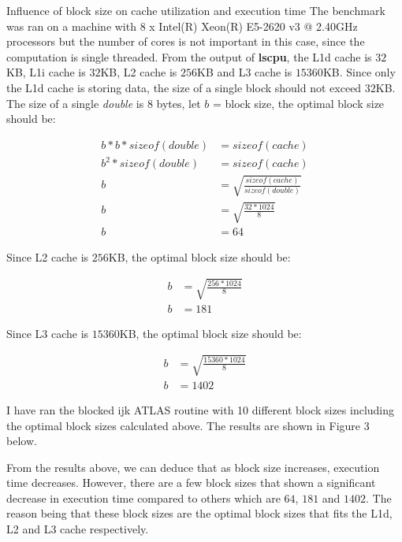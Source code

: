 \documentclass[12pt]{article}
\begin{document}
\begin{section}{Influence of block size on cache utilization and execution time}
 The benchmark was ran on a machine with 8 x Intel(R) Xeon(R) E5-2620 v3 @ 2.40GHz processors but the number of cores is not important in this case,
 since the computation is single threaded. From the output of \textbf{lscpu}, the L1d cache is $32$KB, L1i cache is $32$KB, L2 cache is $256$KB
 and L3 cache is $15360$KB. Since only the L1d cache is storing data, the size of a single block should not exceed $32$KB. The size of a single
 \textit{double} is $8$ bytes, let $b$ = block size, the optimal block size should be:

 \begin{align*}
     b * b * sizeof(double) & = sizeof(cache)                               \\
     b^2 * sizeof(double)   & = sizeof(cache)                               \\
     b                      & = \sqrt{\frac{sizeof(cache)}{sizeof(double)}} \\
     b                      & = \sqrt{\frac{32 * 1024}{8}}                  \\
     b                      & = 64
 \end{align*}

 Since L2 cache is $256$KB, the optimal block size should be:

 \begin{align*}
     b & = \sqrt{\frac{256 * 1024}{8}} \\
     b & = 181
 \end{align*}

 Since L3 cache is $15360$KB, the optimal block size should be:

 \begin{align*}
     b & = \sqrt{\frac{15360 * 1024}{8}} \\
     b & = 1402
 \end{align*}

 I have ran the blocked ijk ATLAS routine with 10 different block sizes including the optimal block sizes calculated above. The results
 are shown in Figure 3 below.


 From the results above, we can deduce that as block size increases, execution time decreases. However, there are a few
 block sizes that shown a significant decrease in execution time compared to others which are $64$, $181$ and $1402$.
 The reason being that these block sizes are the optimal block sizes that fits the L1d, L2 and L3 cache respectively. \\


\end{section}
\end{document}

